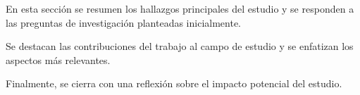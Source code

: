 \label{sec:conclusiones}

En esta sección se resumen los hallazgos principales del estudio y se responden a las preguntas de investigación planteadas inicialmente.

Se destacan las contribuciones del trabajo al campo de estudio y se enfatizan los aspectos más relevantes.

Finalmente, se cierra con una reflexión sobre el impacto potencial del estudio.